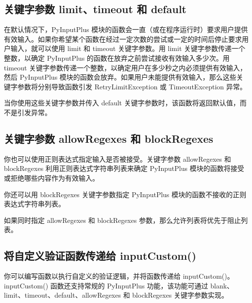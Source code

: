 \subsection{关键字参数 limit、timeout 和 default}
在默认情况下，PyInputPlus 模块的函数会一直（或在程序运行时）要求用户提供有效输入。如果你希望某个函数在经过一定次数的尝试或一定的时间后停止要求用户输入，就可以使用 limit 和 timeout 关键字参数。用 limit 关键字参数传递一个整数，以确定 PyInputPlus 的函数在放弃之前尝试接收有效输入多少次。用 timeout 关键字参数传递一个整数，以确定用户在多少秒之内必须提供有效输入，然后 PyInputPlus 模块的函数会放弃。如果用户未能提供有效输入，那么这些关键字参数将分别导致函数引发 RetryLimitException 或 TimeoutException 异常。

当你使用这些关键字参数并传入 default 关键字参数时，该函数将返回默认值，而不是引发异常。
\subsection{关键字参数 allowRegexes 和 blockRegexes}
你也可以使用正则表达式指定输入是否被接受。关键字参数 allowRegexes 和 blockRegexes 利用正则表达式字符串列表来确定 PyInputPlus 模块的函数将接受或拒绝哪些内容作为有效输入。

你还可以用 blockRegexes 关键字参数指定 PyInputPlus 模块的函数不接收的正则表达式字符串列表。

如果同时指定 allowRegexes 和 blockRegexes 参数，那么允许列表将优先于阻止列表。
\subsection{将自定义验证函数传递给 inputCustom()}
你可以编写函数以执行自定义的验证逻辑，并将函数传递给 inputCustom()。inputCustom() 函数还支持常规的 PyInputPlus 功能，该功能可通过
blank、limit、timeout、default、allowRegexes 和 blockRegexes 关键字参数实现。